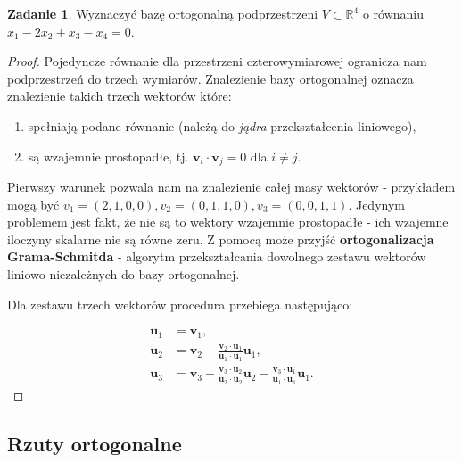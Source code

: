 \documentclass[11pt]{article}
\theoremstyle{definition}
\newtheorem{zadanie}{Zadanie}
\begin{document}
\begin{zadanie}
    Wyznaczyć bazę ortogonalną podprzestrzeni $V\subset \mathbb R^4$ o równaniu $x_1-2x_2+x_3-x_4 = 0$.
\end{zadanie}
\begin{proof}
    Pojedyncze równanie dla przestrzeni czterowymiarowej ogranicza nam podprzestrzeń do trzech wymiarów. Znalezienie bazy ortogonalnej oznacza znalezienie takich trzech wektorów które:
    \begin{enumerate}
        \item spełniają podane równanie (należą do \textit{jądra} przekształcenia liniowego),
        \item są wzajemnie prostopadłe, tj. $\mathbf v_i\cdot\mathbf v_j = 0$ dla $i\neq j$.
    \end{enumerate}

    Pierwszy warunek pozwala nam na znalezienie całej masy wektorów - przykładem mogą być $v_1=(2,1,0,0), v_2 = (0,1,1,0), v_3=(0,0,1,1)$. Jedynym problemem jest fakt, że nie są to wektory wzajemnie prostopadłe - ich wzajemne iloczyny skalarne nie są równe zeru. Z pomocą może przyjść \textbf{ortogonalizacja Grama-Schmitda} - algorytm przekształcania dowolnego zestawu wektorów liniowo niezależnych do bazy ortogonalnej.

    Dla zestawu trzech wektorów procedura przebiega następująco:

    \begin{align*}
        \mathbf u_1 & = \mathbf v_1,                                                                                                                                                              \\
        \mathbf u_2 & = \mathbf v_2 - \frac{\mathbf v_2\cdot \mathbf u_1}{\mathbf u_1\cdot \mathbf u_1}\mathbf u_1,                                                                               \\
        \mathbf u_3 & = \mathbf v_3 - \frac{\mathbf v_3\cdot \mathbf u_2}{\mathbf u_2\cdot \mathbf u_2}\mathbf u_2- \frac{\mathbf v_3\cdot \mathbf u_1}{\mathbf u_1\cdot \mathbf u_1}\mathbf u_1.
    \end{align*}
\end{proof}

\subsection{Rzuty ortogonalne}
\end{document}
